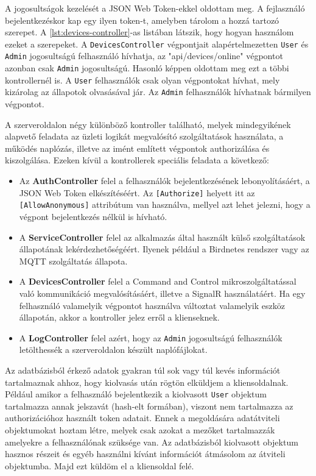 A jogosultságok kezelését a JSON Web Token-ekkel oldottam meg. A fejlasználó bejelentkezéskor kap egy ilyen token-t, 
amelyben tárolom a hozzá tartozó szerepet. A \ref{lst:devices-controller}-as listában látszik, hogy hogyan használom ezeket a szerepeket.
A \verb+DevicesController+ végpontjait alapértelmezetten \verb+User+ és \verb+Admin+ jogosultságú felhasználó hívhatja, az "api/devices/online" végpontot azonban csak \verb+Admin+ jogosultságú.
Hasonló képpen oldottam meg ezt a többi kontrollernél is. A \verb+User+ felhasználók csak olyan végpontokat hívhat, mely kizárolag az állapotok olvasásával jár.
Az \verb+Admin+ felhasználók hívhatnak bármilyen végpontot.

A szerveroldalon négy különböző kontroller található, melyek mindegyikének alapvető feladata az üzleti logikát megvalósító szolgáltatások használata, a működés naplózás,
illetve az imént említett végpontok authorizálása és kiszolgálása. Ezeken kívül a kontrollerek speciális feladata a következő:
\begin{itemize}
    \item Az \textbf{AuthController} felel a felhasználók bejelentkezésének lebonyolításáért, a JSON Web Token elkészítéséért. Az \verb+[Authorize]+ helyett itt az \verb+[AllowAnonymous]+ attribútum van használva, mellyel azt lehet jelezni, hogy a végpont bejelentkezés nélkül is hívható.
    \item A \textbf{ServiceController} felel az alkalmazás által használt külső szolgáltatások állapotának lekérdezhetőségéért. Ilyenek például a Birdnetes rendszer vagy az MQTT szolgáltatás állapota.
    \item A \textbf{DevicesController} felel a Command and Control mikroszolgáltatással való kommunikáció megvalósításáért, illetve a SignalR használatáért. Ha egy felhasználó valamelyik végpontot használva változtat valamelyik eszköz állapotán, akkor a kontroller jelez erről a klienseknek.
    \item A \textbf{LogController} felel azért, hogy az \verb+Admin+ jogosultságú felhasználók letölthessék a szerveroldalon készült naplófájlokat.
\end{itemize}

Az adatbázisból érkező adatok gyakran túl sok vagy túl kevés információt tartalmaznak ahhoz, hogy kiolvasás után rögtön elküldjem a kliensoldalnak.
Például amikor a felhasználó bejelentkezik a kiolvasott \verb+User+ objektum tartalmazza annak jelszavát (hash-elt formában), viszont nem tartalmazza az authorizációhoz használt token adatait.
Ennek a megoldására adatátviteli objektumokat hoztam létre, melyek csak azokat a mezőket tartalmazzák amelyekre a felhasználónak szüksége van.
Az adatbázisból kiolvasott objektum hasznos részeit és egyéb használni kívánt információt átmásolom az átviteli objektumba. Majd ezt küldöm el a kliensoldal felé.

